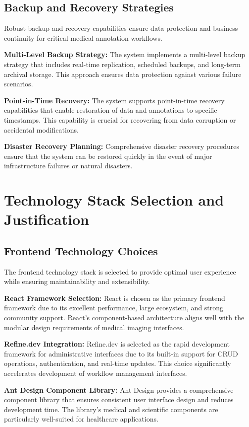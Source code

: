 \subsection{Backup and Recovery Strategies}

Robust backup and recovery capabilities ensure data protection and business continuity for critical medical annotation workflows.

\textbf{Multi-Level Backup Strategy:} The system implements a multi-level backup strategy that includes real-time replication, scheduled backups, and long-term archival storage. This approach ensures data protection against various failure scenarios.

\textbf{Point-in-Time Recovery:} The system supports point-in-time recovery capabilities that enable restoration of data and annotations to specific timestamps. This capability is crucial for recovering from data corruption or accidental modifications.

\textbf{Disaster Recovery Planning:} Comprehensive disaster recovery procedures ensure that the system can be restored quickly in the event of major infrastructure failures or natural disasters.

\section{Technology Stack Selection and Justification}

\subsection{Frontend Technology Choices}

The frontend technology stack is selected to provide optimal user experience while ensuring maintainability and extensibility.

\textbf{React Framework Selection:} React is chosen as the primary frontend framework due to its excellent performance, large ecosystem, and strong community support. React's component-based architecture aligns well with the modular design requirements of medical imaging interfaces.

\textbf{Refine.dev Integration:} Refine.dev is selected as the rapid development framework for administrative interfaces due to its built-in support for CRUD operations, authentication, and real-time updates. This choice significantly accelerates development of workflow management interfaces.

\textbf{Ant Design Component Library:} Ant Design provides a comprehensive component library that ensures consistent user interface design and reduces development time. The library's medical and scientific components are particularly well-suited for healthcare applications.

